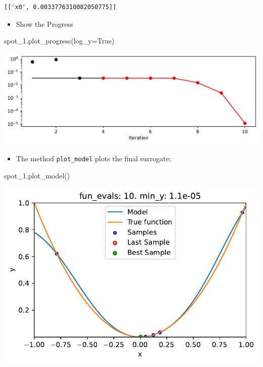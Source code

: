 \documentclass[
  letterpaper,
  DIV=11,
  numbers=noendperiod]{scrreprt}
\newenvironment{Shaded}{\begin{snugshade}}{\end{snugshade}}
\newcommand{\NormalTok}[1]{\textcolor[rgb]{0.00,0.23,0.31}{#1}}
\newcommand{\OperatorTok}[1]{\textcolor[rgb]{0.37,0.37,0.37}{#1}}
\newcommand{\VariableTok}[1]{\textcolor[rgb]{0.07,0.07,0.07}{#1}}
\providecommand{\tightlist}{%
  \setlength{\itemsep}{0pt}\setlength{\parskip}{0pt}}\usepackage{longtable,booktabs,array}
\begin{document}
\begin{verbatim}
[['x0', 0.0033776310082050775]]
\end{verbatim}

\begin{itemize}
\tightlist
\item
  Show the Progress
\end{itemize}

\begin{Shaded}
\begin{Highlighting}[]
\NormalTok{spot\_1.plot\_progress(log\_y}\OperatorTok{=}\VariableTok{True}\NormalTok{)}
\end{Highlighting}
\end{Shaded}

\includegraphics{010_num_spot_sklearn_surrogate_files/figure-pdf/cell-41-output-1.pdf}

\begin{itemize}
\tightlist
\item
  The method \texttt{plot\_model} plots the final surrogate:
\end{itemize}

\begin{Shaded}
\begin{Highlighting}[]
\NormalTok{spot\_1.plot\_model()}
\end{Highlighting}
\end{Shaded}

\includegraphics{010_num_spot_sklearn_surrogate_files/figure-pdf/cell-42-output-1.pdf}
\end{document}
